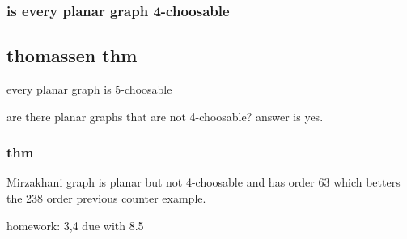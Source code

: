 \documentclass[letterpaper]{article}
\begin{document}
\subsubsection*{is every planar graph 4-choosable}


\subsection*{thomassen thm}
every planar graph is 5-choosable

are there planar graphs that are not 4-choosable? answer is yes.

\subsubsection*{thm}
Mirzakhani graph is planar but not 4-choosable and has order 63 which betters the 238 order previous counter example.

homework:
3,4 due with 8.5
\end{document}
